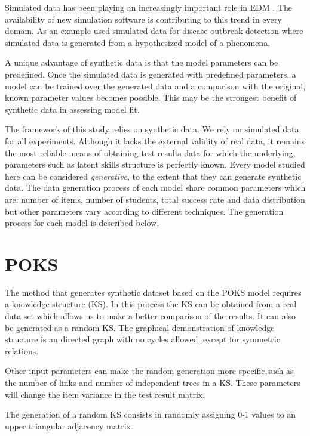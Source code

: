 \label{sec:Syn}


Simulated data has been playing an increasingly important role in EDM \citep{JEDM:baker2009}. The availability of new simulation software is contributing to this trend in every domain. As an example \citet{jafarpour2015quantifying} used simulated data for disease outbreak detection where simulated data is generated from a hypothesized model of a phenomena.

A unique advantage of synthetic data is that the model parameters can be predefined. Once the simulated data is generated with predefined parameters, a model can be trained over the generated data and a comparison with the original, known parameter values becomes possible. This may be the strongest benefit of synthetic data in assessing model fit. 

The framework of this study relies on synthetic data. We rely on simulated data for all experiments. Although it lacks the external validity of real data, it remains the most reliable means of obtaining test results data for which the underlying, parameters such as latent skills structure is perfectly known. Every model studied here can be considered \textit{generative}, to the extent that they can generate synthetic data.  The data generation process of each model share common parameters which are: number of items, number of students, total success rate and data distribution but other parameters vary according to different techniques.  The generation process for each model is described below.


\section{POKS}
The method that generates synthetic dataset based on the POKS model requires a knowledge structure (KS). In this process the KS can be obtained from a real data set which allows us to make a better comparison of the results. It can also be generated as a random KS. The graphical demonstration of knowledge structure is an directed graph with no cycles allowed, except for symmetric relations.  

Other input parameters can make the random generation more specific,such as the number of links and number of independent trees in a KS. These parameters will change the item variance in the test result matrix. 

The generation of a random KS consists in randomly assigning 0-1 values to an upper triangular adjacency matrix. 

